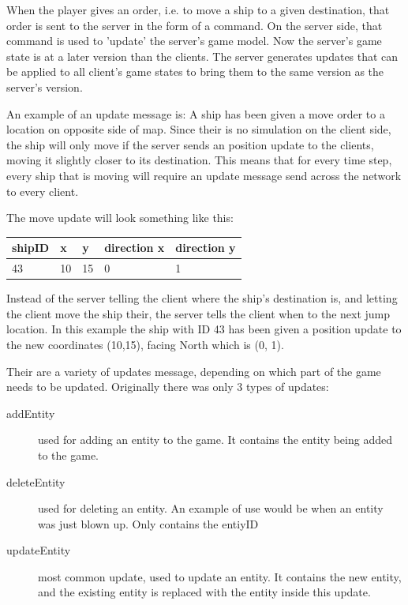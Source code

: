 When the player gives an order, i.e. to move a ship to a given destination, that order is sent to the server in the form of a command.
On the server side, that command is used to 'update' the server's game model. Now the server's game state is at a later version than the clients. The server generates updates that can be applied to all client's game states to bring them to the same version as the server's version.

An example of an update message is: A ship has been given a move order to a location on opposite side of map.
Since their is no simulation on the client side, the ship will only move if the server sends an position update to the clients, moving it slightly closer to its destination. This means that for every time step, every ship that is moving will require an update message send across the network to every client. 

The move update will look something like this:
\begin{center}
    \begin{tabular}{| l | l | l | l | l |}
    \hline
    shipID & x & y & direction x & direction y \\ \hline
    43 & 10 & 15 & 0 & 1 \\ \hline
    \hline
    \end{tabular}
\end{center}

Instead of the server telling the client where the ship's destination is, and letting the client move the ship their, the server tells the client when to the next jump location. In this example the ship with ID 43 has been given a position update to the new coordinates (10,15), facing North which is (0, 1).

Their are a variety of updates message, depending on which part of the game needs to be updated. 
Originally there was only 3 types of updates:
\begin{description}
\item[addEntity] used for adding an entity to the game. It contains the entity being added to the game.
\item[deleteEntity] used for deleting an entity. An example of use would be when an entity was just blown up. Only contains the entiyID
\item[updateEntity] most common update, used to update an entity. It contains the new entity, and the existing entity is replaced with the entity inside this update.
\end{description}

